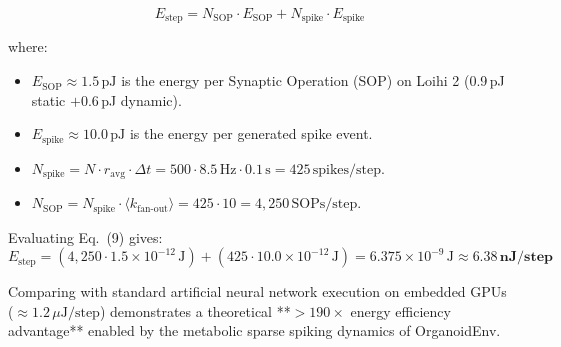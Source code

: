 \documentclass[utf8]{frontiers_suppmat}
\begin{document}
\begin{equation}
E_{\text{step}} = N_{\text{SOP}} \cdot E_{\text{SOP}} + N_{\text{spike}} \cdot E_{\text{spike}}
\end{equation}

where:
\begin{itemize}
\item $E_{\text{SOP}} \approx 1.5\,\text{pJ}$ is the energy per Synaptic Operation (SOP) on Loihi 2 (0.9\,pJ static $+ 0.6$\,pJ dynamic).
\item $E_{\text{spike}} \approx 10.0\,\text{pJ}$ is the energy per generated spike event.
\item $N_{\text{spike}} = N \cdot r_{\text{avg}} \cdot \Delta t = 500 \cdot 8.5\,\text{Hz} \cdot 0.1\,\text{s} = 425\,\text{spikes/step}$.
\item $N_{\text{SOP}} = N_{\text{spike}} \cdot \langle k_{\text{fan-out}} \rangle = 425 \cdot 10 = 4{,}250\,\text{SOPs/step}$.
\end{itemize}

Evaluating Eq.~(9) gives:
\begin{equation}
E_{\text{step}} = (4{,}250 \cdot 1.5 \times 10^{-12}\,\text{J}) + (425 \cdot 10.0 \times 10^{-12}\,\text{J}) = 6.375 \times 10^{-9}\,\text{J} \approx \mathbf{6.38\,\text{nJ/step}}
\end{equation}

Comparing with standard artificial neural network execution on embedded GPUs ($\approx 1.2\,\mu\text{J/step}$) demonstrates a theoretical **$>190\times$ energy efficiency advantage** enabled by the metabolic sparse spiking dynamics of OrganoidEnv.
\end{document}
